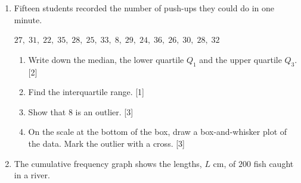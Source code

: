 \documentclass[12pt, twoside]{article}
\begin{document}
\begin{enumerate}[itemsep=0.15cm]
\item[2.] [Maximum mark: 9]

Fifteen students recorded the number of push-ups they could do in one
minute.

\begin{center}
$27,\; 31,\; 22,\; 35,\; 28,\; 25,\; 33,\; 8,\; 29,\; 24,\; 36,\; 26,\;
30,\; 28,\; 32$
\end{center}

\begin{enumerate}[itemsep=0.1cm]
  \item Write down the median, the lower quartile $Q_{1}$ and the upper
  quartile $Q_{3}$. \hfill [2]
  \item Find the interquartile range. \hfill [1]
  \item Show that $8$ is an outlier. \hfill [3]
  \item On the scale at the bottom of the box, draw a box-and-whisker
  plot of the data. Mark the outlier with a cross. \hfill [3]
\end{enumerate}


\newpage

\item[3.] [Maximum mark: 9]

The cumulative frequency graph shows the lengths, $L$ cm, of $200$ fish
caught in a river.


\end{enumerate}
\end{document}
